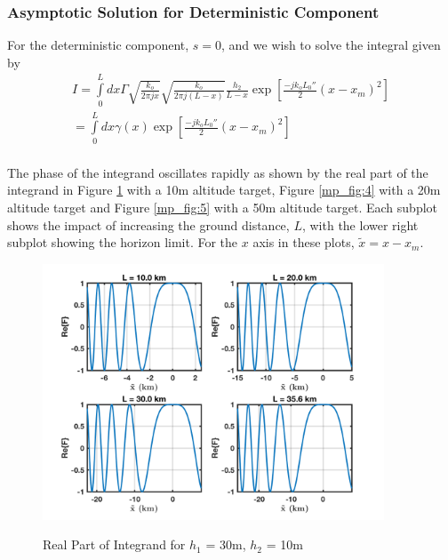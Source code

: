 \subsubsection{Asymptotic Solution for Deterministic Component}
For the deterministic component, $s = 0$, and we wish to solve the integral given by
\begin{equation}
\begin{gathered}
I = \int\limits_{0}^{L}dx\Gamma \sqrt{\frac{k_o}{2\pi jx}}\sqrt{\frac{k_o}{2\pi j (L-x)}}\frac{h_2}{L-x}\exp\left[\frac{-jk_oL_0''}{2}(x-x_m)^2\right] \\
= \int\limits_{0}^{L}dx\gamma(x)\exp\left[\frac{-jk_oL_0''}{2}(x-x_m)^2\right] \\
\end{gathered}
\label{mp_eq:22}
\end{equation}

The phase of the integrand oscillates rapidly as shown by the real part of the integrand in Figure \ref{mp_fig:3} with a 10m altitude target, Figure \ref{mp_fig:4} with a 20m altitude target and Figure \ref{mp_fig:5} with a 50m altitude target. Each subplot shows the impact of increasing the ground distance, $L$, with the lower right subplot showing the horizon limit. For the $x$ axis in these plots, $\tilde{x} = x-x_m$.

\begin{figure}[H]
  \begin{center}
\includegraphics[width=4in]{../media/analysis/phaseVariation_30_10}
  \end{center}
  \renewcommand{\baselinestretch}{1} \small\normalsize
  \begin{quote}
    \caption[Real Part of Integrand for $h_1$ = 30m, $h_2$ = 10m]{ Real Part of Integrand for $h_1$ = 30m, $h_2$ = 10m\label{mp_fig:3}}
  \end{quote}
\end{figure}
\renewcommand{\baselinestretch}{2} \small\normalsize

